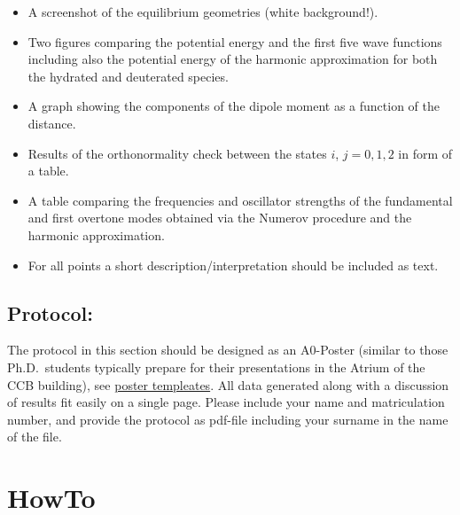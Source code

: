 \documentclass[
  letterpaper,
]{article}
\providecommand{\tightlist}{%
  \setlength{\itemsep}{0pt}\setlength{\parskip}{0pt}}\usepackage{longtable,booktabs,array}
\begin{document}
\begin{tcolorbox}[enhanced jigsaw, toptitle=1mm, opacitybacktitle=0.6, colframe=quarto-callout-important-color-frame, toprule=.15mm, breakable, bottomrule=.15mm, left=2mm, title={The report for this part should include:}, titlerule=0mm, leftrule=.75mm, bottomtitle=1mm, coltitle=black, arc=.35mm, rightrule=.15mm, opacityback=0, colback=white, colbacktitle=quarto-callout-important-color!10!white]

\begin{itemize}
\tightlist
\item
  A screenshot of the equilibrium geometries (white background!).
\item
  Two figures comparing the potential energy and the first five wave
  functions including also the potential energy of the harmonic
  approximation for both the hydrated and deuterated species.
\item
  A graph showing the components of the dipole moment as a function of
  the distance.
\item
  Results of the orthonormality check between the states \(i\),
  \(j = {0,1,2}\) in form of a table.
\item
  A table comparing the frequencies and oscillator strengths of the
  fundamental and first overtone modes obtained via the Numerov
  procedure and the harmonic approximation.
\item
  For all points a short description/interpretation should be included
  as text.
\end{itemize}

\end{tcolorbox}

\hypertarget{protocol}{%
\subsection*{Protocol:}\label{protocol}}


The protocol in this section should be designed as an A0-Poster (similar
to those Ph.D.~students typically prepare for their presentations in the
Atrium of the CCB building), see
\protect\hyperlink{poster-templates}{poster templeates}. All data
generated along with a discussion of results fit easily on a single
page. Please include your name and matriculation number, and provide the
protocol as pdf-file including your surname in the name of the file.

\hypertarget{howto}{%
\section{HowTo}\label{howto}}
\end{document}
